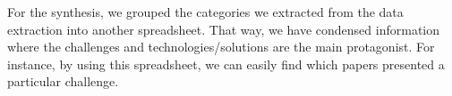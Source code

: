 
For the synthesis, we grouped the categories we extracted from the data extraction into another spreadsheet. That way, we have condensed information where the challenges and technologies/solutions are the main protagonist. For instance, by using this spreadsheet, we can easily find which papers presented a particular challenge. 
%


